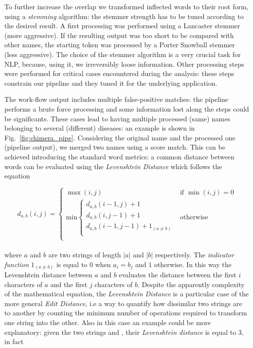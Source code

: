 \documentclass{standalone}
\begin{document}
To further increase the overlap we transformed inflected words to their root form, using a \emph{stemming} algorithm: the stemmer strength has to be tuned according to the desired result.
A first processing was performed using a \textsf{Lancaster} stemmer (more aggressive).
If the resulting output was too short to be compared with other names, the starting token was processed by a \textsf{Porter Snowball} stemmer (less aggressive).
The choice of the stemmer algorithm is a very crucial task for NLP, because, using it, we irreversibly loose information.
Other processing steps were performed for critical cases encountered during the analysis: these steps constrain our pipeline and they tuned it for the underlying application.

The work-flow output includes multiple false-positive matches: the pipeline performs a brute force processing and some information lost along the steps could be significants.
These cases lead to having multiple processed (same) names belonging to several (different) diseases: an example is shown in Fig.~\ref{fig:chimera_pipe}.
Considering the original name and the processed one (pipeline output), we merged two names using a score match.
This can be achieved introducing the standard word metrics: a common distance between words can be evaluated using the \emph{Levenshtein Distance} which follows the equation

\begin{equation}
d_{a, b}(i, j) = \left\{ \begin{array}{rc}
  \max(i, j)                                                       & \mbox{if   } \min(i, j) = 0 \\
  \mbox{min} \left\{ \begin{array}{r}
      d_{a, b}(i - 1, j) + 1                     \\
      d_{a, b}(i, j - 1) + 1                     \\
      d_{a, b}(i - 1, j - 1) + 1_{(a \neq b)}    \\
    \end{array}
    \right.                                                        & \mbox{otherwise}            \\

  \end{array}
  \right.
\end{equation}
\\
where $a$ and $b$ are two strings of length $|a|$ and $|b|$ respectively.
The \emph{indicator function} $1_{(a \neq b)}$ is equal to $0$ when $a_i = b_j$ and $1$ otherwise.
In this way the Levenshtein distance between $a$ and $b$ evaluates the distance between the first $i$ characters of $a$ and the first $j$ characters of $b$.
Despite the apparently complexity of the mathematical equation, the \emph{Levenshtein Distance} is a particular case of the more general \emph{Edit Distance}, i.e a way to quantify how dissimilar two strings are to another by counting the minimum number of operations required to transform one string into the other.
Also in this case an example could be more explanatory: given the two strings  and , their \emph{Levenshtein distance} is equal to $3$, in fact
\end{document}
